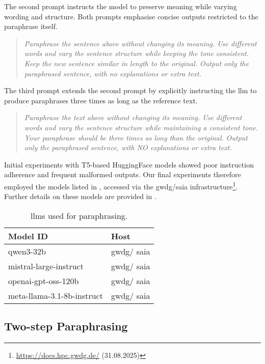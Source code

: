 The second prompt instructs the model to preserve meaning while varying wording and structure. 
Both prompts emphasise concise outputs restricted to the paraphrase itself.
\begin{quote}
    \textit{Paraphrase the sentence above without changing its meaning. Use different words and vary the sentence structure while keeping the tone consistent. Keep the new sentence similar in length to the original. Output only the paraphrased sentence, with no explanations or extra text.}
\end{quote}

The third prompt extends the second prompt by explicitly instructing the \ac{llm} to produce paraphrases three times as long as the reference text.
\begin{quote}
  \textit{Paraphrase the text above without changing its meaning. Use different words and vary the sentence structure while maintaining a consistent tone. Your paraphrase should be three times as long than the original. Output only the paraphrased sentence, with NO explanations or extra text.}
\end{quote}

Initial experiments with T5-based HuggingFace models showed poor instruction adherence and frequent malformed outputs. 
Our final experiments therefore employed the models listed in , accessed via the \ac{gwdg}/\ac{saia} infrastructure\footnote{\url{https://docs.hpc.gwdg.de/} (31.08.2025)}.
Further details on these models are provided in .

\begin{table}[h]
\centering
\caption{\acp{llm} used for paraphrasing.}
\label{tab:base_llms}
\begin{tabular}{@{}ll@{}}
\toprule
\textbf{Model ID}                    & \textbf{Host} \\
\midrule
qwen3-32b                            & \ac{gwdg}/ \ac{saia}    \\
mistral-large-instruct               & \ac{gwdg}/ \ac{saia}    \\
openai-gpt-oss-120b                  & \ac{gwdg}/ \ac{saia}    \\
meta-llama-3.1-8b-instruct           & \ac{gwdg}/ \ac{saia}    \\
\bottomrule   
\end{tabular}%
\end{table}


\subsection{Two-step Paraphrasing}

